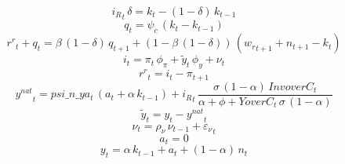 \documentclass[10pt,a4paper]{article}
\begin{document}
\begin{dmath}
{i_R}_{t}\, {\delta}={k}_{t}-\left(1-{\delta}\right)\, {k}_{t-1}
\end{dmath}
\begin{dmath}
{q}_{t}={\psi_c}\, \left({k}_{t}-{k}_{t-1}\right)
\end{dmath}
\begin{dmath}
{r^r}_{t}+{q}_{t}={\beta}\, \left(1-{\delta}\right)\, {q}_{t+1}+\left(1-{\beta}\, \left(1-{\delta}\right)\right)\, \left({w_r}_{t+1}+{n}_{t+1}-{k}_{t}\right)
\end{dmath}
\begin{dmath}
{i}_{t}={\pi}_{t}\, {\phi_{\pi}}+{\tilde y}_{t}\, {\phi_{y}}+{\nu}_{t}
\end{dmath}
\begin{dmath}
{r^r}_{t}={i}_{t}-{\pi}_{t+1}
\end{dmath}
\begin{dmath}
{y^{nat}}_{t}=psi\_n\_ya_{t}\, \left({a}_{t}+{\alpha}\, {k}_{t-1}\right)+{i_R}_{t}\, \frac{{\sigma}\, \left(1-{\alpha}\right)\, InvoverC_{t}}{{\alpha}+{\phi}+YoverC_{t}\, {\sigma}\, \left(1-{\alpha}\right)}
\end{dmath}
\begin{dmath}
{\tilde y}_{t}={y}_{t}-{y^{nat}}_{t}
\end{dmath}
\begin{dmath}
{\nu}_{t}={\rho_{\nu}}\, {\nu}_{t-1}+{\varepsilon_\nu}_{t}
\end{dmath}
\begin{dmath}
{a}_{t}=0
\end{dmath}
\begin{dmath}
{y}_{t}={\alpha}\, {k}_{t-1}+{a}_{t}+\left(1-{\alpha}\right)\, {n}_{t}
\end{dmath}
\end{document}
